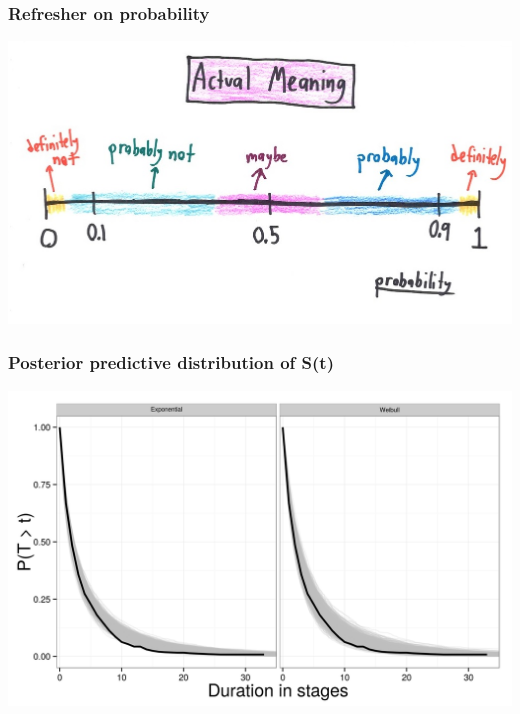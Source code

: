 \documentclass{beamer}
\begin{document}
\begin{frame}
  \frametitle{Refresher on probability}

  \includegraphics[width = \textwidth,height = 0.8\textheight,keepaspectratio = true]{figure/probability}

  \tiny{}
\end{frame}


\begin{frame}
  \frametitle{Posterior predictive distribution of S(t)}
  
  \begin{center}
    \includegraphics[width = \textwidth,height = 0.8\textheight,keepaspectratio = true]{figure/survival_curves}
  \end{center}
\end{frame}
\end{document}
